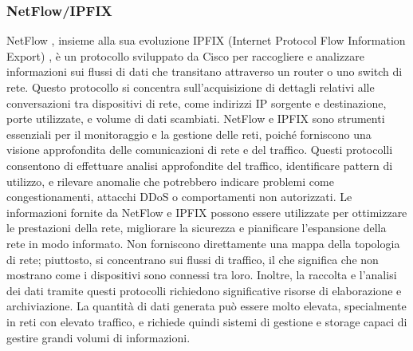 \documentclass[target=bach,aauheader=,style=]{thud}
\begin{document}
\subsubsection{NetFlow/IPFIX}
NetFlow \cite{cisco_netflow}, insieme alla sua evoluzione IPFIX (Internet Protocol Flow Information Export) \cite{rfc7011}, è un protocollo sviluppato da Cisco per raccogliere e analizzare informazioni sui flussi di dati che transitano attraverso un router o uno switch di rete. Questo protocollo si concentra sull'acquisizione di dettagli relativi alle conversazioni tra dispositivi di rete, come indirizzi IP sorgente e destinazione, porte utilizzate, e volume di dati scambiati. NetFlow e IPFIX sono strumenti essenziali per il monitoraggio e la gestione delle reti, poiché forniscono una visione approfondita delle comunicazioni di rete e del traffico.
\newline
Questi protocolli consentono di effettuare analisi approfondite del traffico, identificare pattern di utilizzo, e rilevare anomalie che potrebbero indicare problemi come congestionamenti, attacchi DDoS o comportamenti non autorizzati. Le informazioni fornite da NetFlow e IPFIX possono essere utilizzate per ottimizzare le prestazioni della rete, migliorare la sicurezza e pianificare l'espansione della rete in modo informato.
\newline
Non forniscono direttamente una mappa della topologia di rete; piuttosto, si concentrano sui flussi di traffico, il che significa che non mostrano come i dispositivi sono connessi tra loro. Inoltre, la raccolta e l'analisi dei dati tramite questi protocolli richiedono significative risorse di elaborazione e archiviazione. La quantità di dati generata può essere molto elevata, specialmente in reti con elevato traffico, e richiede quindi sistemi di gestione e storage capaci di gestire grandi volumi di informazioni.
\end{document}
